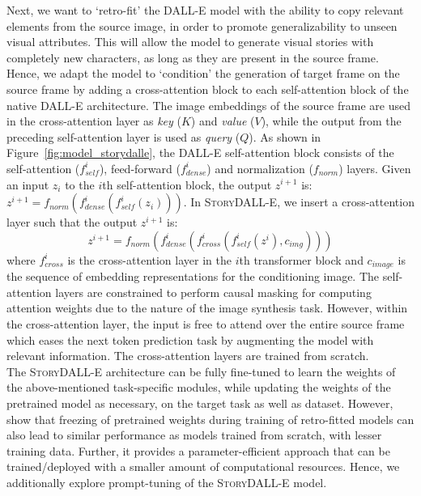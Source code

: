\documentclass[runningheads]{llncs}
\newcommand{\sdalle}[1]{\textsc{StoryDALL-E}}
\begin{document}
Next, we want to `retro-fit' the DALL-E model with the ability to copy relevant elements from the source image, in order to promote generalizability to unseen visual attributes. This will allow the model to generate visual stories with completely new characters, as long as they are present in the source frame. Hence, we adapt the model to `condition' the generation of target frame on the source frame by adding a cross-attention block to each self-attention block of the native DALL-E architecture. The image embeddings of the source frame are used in the cross-attention layer as \textit{key} ($K$) and \textit{value} ($V$), while the output from the preceding self-attention layer is used as \textit{query} ($Q$). As shown in Figure~\ref{fig:model_storydalle}, the DALL-E self-attention block consists of the self-attention ($f_{self}^i$), feed-forward ($f_{dense}^{i}$) and normalization ($f_{norm}$) layers. Given an input $z_i$ to the $i$th self-attention block, the output $z^{i+1}$ is: $z^{i+1} = f_{norm}(f_{dense}^{i}(f_{self}^{i}(z_i)))$. In \sdalle{}, we insert a cross-attention layer such that the output $z^{i+1}$ is:
\begin{equation}
    z^{i+1} = f_{norm}(f_{dense}^{i}(f_{cross}^{i}(f_{self}^{i}(z^i), {c_{img}})))
\end{equation}
where $f_{cross}^{i}$ is the cross-attention layer in the $i$th transformer block and $c_{image}$ is the sequence of embedding representations for the conditioning image. The self-attention layers are constrained to perform causal masking for computing attention weights due to the nature of the image synthesis task. However, within the cross-attention layer, the input is free to attend over the entire source frame which eases the next token prediction task by augmenting the model with relevant information. The cross-attention layers are trained from scratch.\\

The \sdalle{} architecture can be fully fine-tuned to learn the weights of the above-mentioned task-specific modules, while updating the weights of the pretrained model as necessary, on the target task as well as dataset. However, \cite{borgeaud2022improving} show that freezing of pretrained weights during training of retro-fitted models can also lead to similar performance as models trained from scratch, with lesser training data. Further, it provides a parameter-efficient approach that can be trained/deployed with a smaller amount of computational resources. Hence, we additionally explore prompt-tuning \cite{li2021prefix} of the \sdalle{} model.
\end{document}
